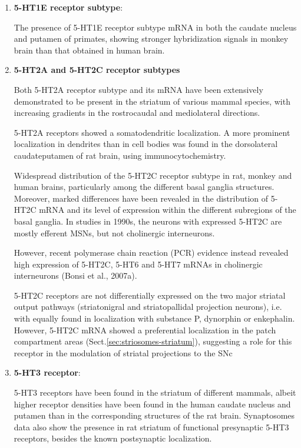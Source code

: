 \begin{enumerate}
  \item {\bf 5-HT1E receptor subtype}:
  
The presence of 5-HT1E receptor subtype mRNA in both the caudate nucleus and
putamen of primates, showing stronger hybridization signals in monkey brain than
that obtained in human brain.


  \item {\bf 5-HT2A and 5-HT2C receptor subtypes}

Both 5-HT2A receptor subtype and its mRNA have been extensively demonstrated to
be present in the striatum of various mammal species, with 
increasing gradients in the rostrocaudal and mediolateral directions.

5-HT2A receptors showed a somatodendritic localization.
A more prominent localization in dendrites than in cell bodies was found in the
dorsolateral caudateputamen of rat brain, using immunocytochemistry.


Widespread distribution of the 5-HT2C receptor subtype in rat, monkey and human
brains, particularly among the different basal ganglia structures.
Moreover, marked differences have been revealed in the distribution of 5-HT2C
mRNA and its level of expression within the different subregions of the basal
ganglia. In studies in 1990s, the neurons with expressed 5-HT2C are mostly
efferent MSNs, but not cholinergic interneurons. 

However, recent polymerase chain reaction (PCR) evidence instead revealed high
expression of 5-HT2C, 5-HT6 and 5-HT7 mRNAs in cholinergic interneurons (Bonsi
et al., 2007a).

5-HT2C receptors are not differentially expressed on the two major striatal
output pathways (striatonigral and striatopallidal projection neurons), i.e.
with equally found in localization with substance P, dynorphin or enkephalin.
However,  5-HT2C mRNA showed a preferential localization in the patch
compartment areas (Sect.\ref{sec:striosomes-striatum}), suggesting a role for
this receptor in the modulation of striatal projections to the SNc


  \item {\bf 5-HT3 receptor}:
  
5-HT3 receptors have been found in the striatum of different mammals, albeit
higher receptor densities have been found in the human caudate nucleus and
putamen than in the corresponding structures of the rat brain.
Synaptosomes data also show the presence in rat striatum  of functional
presynaptic 5-HT3 receptors, besides the known postsynaptic localization.


\end{enumerate}
